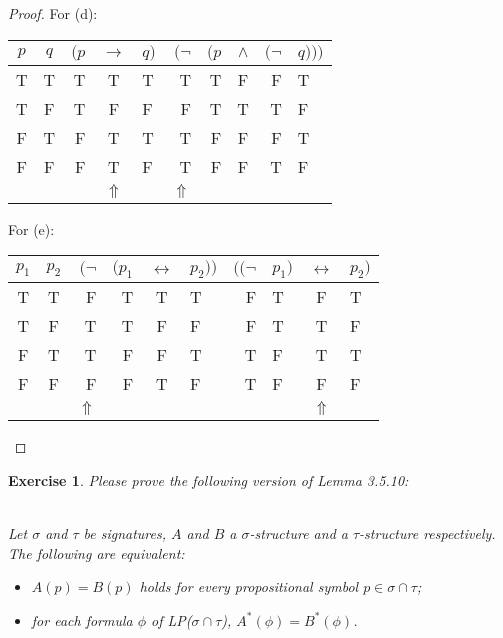 \documentclass[12pt,a4paper]{article}
\theoremstyle{plain}
\newtheorem{exercise}{Exercise}
\begin{document}
\begin{proof}
For (d):
%
\begin{center}
\begin{tabular}{cc||rcl|rrcrl}
$p$ & $q$ & $( p$ & $\rightarrow$ & $q )$ & $( \neg$ & $( p$ & $\wedge$ & $( \neg$ & $q )))$ \\
\hline
T & T & T & T & T & T & T & F & F & T \\
T & F & T & F & F & F & T & T & T & F \\
F & T & F & T & T & T & F & F & F & T \\
F & F & F & T & F & T & F & F & T & F \\
  &   &  & $\Uparrow$ & & $\Uparrow$ &  &  &  &
\end{tabular}
\end{center}

For (e):
%
\begin{center}
\begin{tabular}{cc||rrcl|rlcl}
$p_1$ & $p_2$ & $( \neg$ & $( p_1$ & $\leftrightarrow$ & $p_2 ))$ & $(( \neg$ & $p_1)$ & $\leftrightarrow$ & $p_2 )$ \\
\hline
T & T & F & T & T & T & F & T & F & T \\
T & F & T & T & F & F & F & T & T & F \\
F & T & T & F & F & T & T & F & T & T \\
F & F & F & F & T & F & T & F & F & F \\
  &   & $\Uparrow$ &  &  & & & & $\Uparrow$ &
\end{tabular}
\end{center}
\end{proof}

\begin{exercise}
Please prove the following version of Lemma 3.5.10:

\ \\
Let $\sigma$ and $\tau$ be signatures, $A$ and $B$ a $\sigma$-structure and a $\tau$-structure respectively. 
The following are equivalent:
%
\begin{itemize}

\item[(i)] $A(p) = B(p)$ holds for every propositional symbol $p \in \sigma \cap \tau$;

\item[(ii)] for each formula $\phi$ of LP($\sigma \cap \tau$), $A^* (\phi) = B^* (\phi)$. 

\end{itemize}
\end{exercise}
\end{document}
